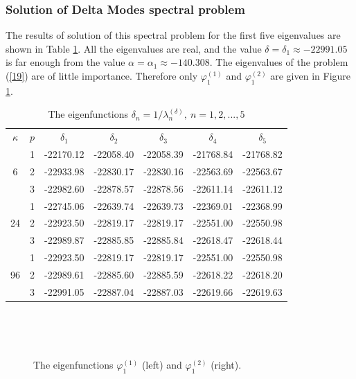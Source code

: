 \documentclass[authoryear]{elsarticle}
\begin{document}
\subsubsection{Solution of Delta  Modes spectral problem} 
The results of solution of this spectral problem for the first five eigenvalues are shown in Table \ref{t-4}. All the eigenvalues are real, and the value $\delta = \delta_1 \approx -22991.05$ is far enough from the value $\alpha  = \alpha_1 \approx -140.308$.
The eigenvalues of the problem (\ref{19}) are of little importance. Therefore only $\varphi^{(1)}_1$ and $\varphi^{(2)}_1$ are given in Figure \ref{fig:12}.
\begin{table}[h]
\caption{The eigenfunctions $\delta_n = 1 / \lambda_n^{(\delta )}, \ n = 1,2,...,5$}
\label{t-4}
\begin{center}
\begin{tabular}{ccccccc}
\rowcolor{col1}
$\kappa$ & $p$ & $\delta_1$ &  $\delta_2$ &  $\delta_3$ &  $\delta_4$ &  $\delta_5$ \\ 
\rowcolor{col3}
   & 1 & -22170.12 & -22058.40 & -22058.39 & -21768.84 & -21768.82 \\
\rowcolor{col2}
6  & 2 & -22933.98 & -22830.17 & -22830.16 & -22563.69 & -22563.67 \\
\rowcolor{col1}
   & 3 & -22982.60 & -22878.57 & -22878.56 & -22611.14 & -22611.12 \\
\rowcolor{col3}
   & 1 & -22745.06 & -22639.74 & -22639.73 & -22369.01 & -22368.99 \\
\rowcolor{col2}
24 & 2 & -22923.50 & -22819.17 & -22819.17 & -22551.00 & -22550.98 \\
\rowcolor{col1}
   & 3 & -22989.87 & -22885.85 & -22885.84 & -22618.47 & -22618.44 \\
\rowcolor{col3}
   & 1 & -22923.50 & -22819.17 & -22819.17 & -22551.00 & -22550.98 \\
\rowcolor{col2}
96 & 2 & -22989.61 & -22885.60 & -22885.59 & -22618.22 & -22618.20 \\
\rowcolor{col1}
   & 3 & -22991.05 & -22887.04 & -22887.03 & -22619.66 & -22619.63 \\
\end{tabular}
\end{center}
\end{table}
\begin{figure}[h]
  \begin{center}
\begin{minipage}{0.49\linewidth}
 \\
\end{minipage}
\hfill
\begin{minipage}{0.49\linewidth}
 \\
\end{minipage}
\caption{The eigenfunctions $\varphi^{(1)}_1$ (left) and $\varphi^{(2)}_1$ (right).}
\label{fig:12}
  \end{center}
\end{figure}
\end{document}
